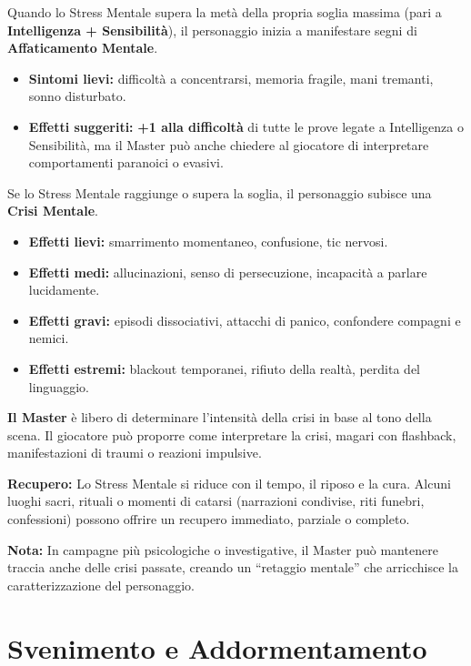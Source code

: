 \documentclass[../manuale_main.tex]{subfiles}
\begin{document}
Quando lo Stress Mentale supera la metà della propria soglia massima (pari a \textbf{Intelligenza + Sensibilità}), il personaggio inizia a manifestare segni di \textbf{Affaticamento Mentale}.

\begin{itemize}
\item \textbf{Sintomi lievi:} difficoltà a concentrarsi, memoria fragile, mani tremanti, sonno disturbato.
\item \textbf{Effetti suggeriti:} \textbf{+1 alla difficoltà} di tutte le prove legate a Intelligenza o Sensibilità, ma il Master può anche chiedere al giocatore di interpretare comportamenti paranoici o evasivi.
\end{itemize}

Se lo Stress Mentale raggiunge o supera la soglia, il personaggio subisce una \textbf{Crisi Mentale}.

\begin{itemize}
\item \textbf{Effetti lievi:} smarrimento momentaneo, confusione, tic nervosi.
\item \textbf{Effetti medi:} allucinazioni, senso di persecuzione, incapacità a parlare lucidamente.
\item \textbf{Effetti gravi:} episodi dissociativi, attacchi di panico, confondere compagni e nemici.
\item \textbf{Effetti estremi:} blackout temporanei, rifiuto della realtà, perdita del linguaggio.
\end{itemize}

\textbf{Il Master} è libero di determinare l’intensità della crisi in base al tono della scena. Il giocatore può proporre come interpretare la crisi, magari con flashback, manifestazioni di traumi o reazioni impulsive.

\textbf{Recupero:} Lo Stress Mentale si riduce con il tempo, il riposo e la cura. Alcuni luoghi sacri, rituali o momenti di catarsi (narrazioni condivise, riti funebri, confessioni) possono offrire un recupero immediato, parziale o completo.

\textbf{Nota:} In campagne più psicologiche o investigative, il Master può mantenere traccia anche delle crisi passate, creando un “retaggio mentale” che arricchisce la caratterizzazione del personaggio.
\clearpage
\section{Svenimento e Addormentamento}
\end{document}
